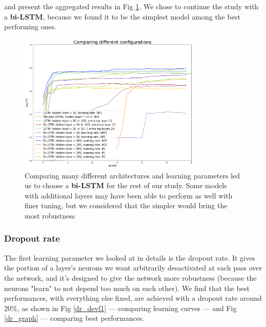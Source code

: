 \documentclass{article} %
\begin{document}
and present the aggregated results in Fig \ref{config_compar}. We chose to continue the study with a \textbf{bi-LSTM}, because we found it to be the simplest model among the best performing ones.

\begin{figure}[h]
\begin{center}
\includegraphics[width=330px]{figs/config_compar.png}
\caption{Comparing many different architectures and learning parameters led us to choose a \textbf{bi-LSTM} for the rest of our study. Some models with additional layers may have been able to perform as well with finer tuning, but we considered that the simpler would bring the most robustness}
\label{config_compar}
\end{center}
\end{figure}

\subsubsection{Dropout rate}

The first learning parameter we looked at in details is the dropout rate. It gives the portion of a layer's neurons we want arbitrarily desactivated at each pass over the network, and it's designed to give the network more robustness (because the neurons "learn" to not depend too much on each other). We find that the best performances, with everything else fixed, are achieved with a dropout rate around 20\%, as shown in Fig \ref{dr_devf1} --- comparing learning curves --- and Fig \ref{dr_graph} --- comparing best performances.
\end{document}
